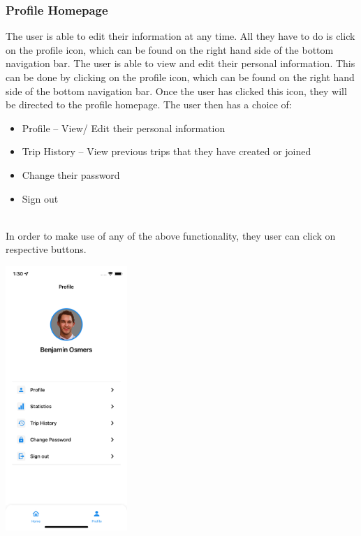 \documentclass[hidelinks, 12pt, a4paper]{article}
\begin{document}
\subsubsection{Profile Homepage}
The user is able to edit their information at any time. All they have to do is click on the profile icon, which can be found on the right hand side of the bottom navigation bar. The user is able to view and edit their personal information. This can be done by clicking on the profile icon, which can be found on the right hand side of the bottom navigation bar. Once the user has clicked this icon, they will be directed to the profile homepage. The user then has a choice of:
\begin{itemize}
    \item Profile – View/ Edit their personal information
    \item Trip History – View previous trips that they have created or joined
    \item Change their password
    \item Sign out
\end{itemize} \\
In order to make use of any of the above functionality, they user can click on respective buttons.
\begin{center}
  \includegraphics[height=10cm]{images/view_profile.png}
\end{center}
\vspace{1cm}
\end{document}
